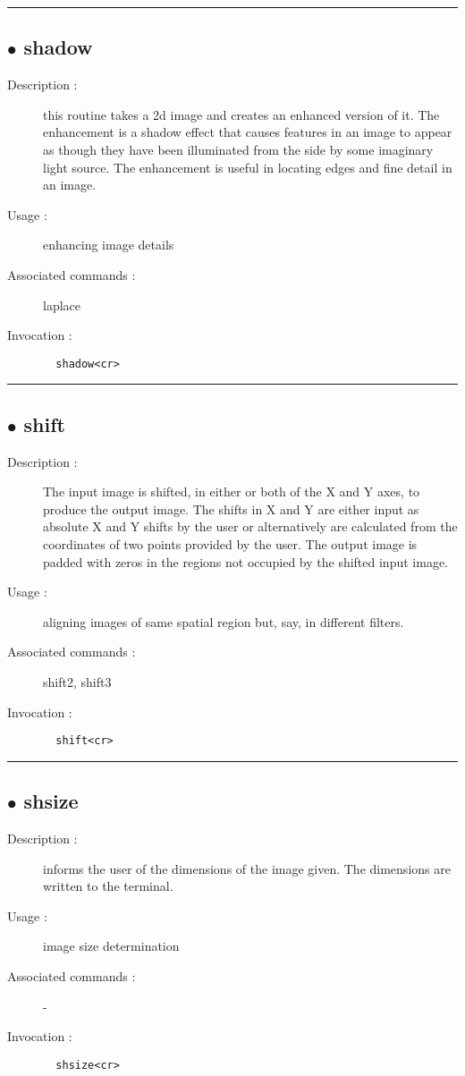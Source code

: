 \hrule \subsection*{$\bullet$ shadow}
\begin{description}
\item[Description :] this routine takes a 2d image and creates an enhanced version of
it. The enhancement is a shadow effect that causes features in an image
to appear as though they have been illuminated from the side by some
imaginary light source. The enhancement is useful in locating edges and
fine detail in an image.
\item[Usage :] enhancing image details
\item[Associated commands :] laplace
\item[Invocation :]

\verb+  shadow<cr> +\end{description}

\hrule \subsection*{$\bullet$ shift}
\begin{description}
\item[Description :] The input image is shifted, in either or both of the X and Y
axes, to produce the output image. The shifts in X and Y are either input
as absolute X and Y shifts by the user or alternatively are calculated
from the coordinates of two points provided by the user. The output image
is padded with zeros in the regions not occupied by the shifted input
image.
\item[Usage :] aligning images of same spatial region but, say, in different
filters.
\item[Associated commands :] shift2, shift3
\item[Invocation :]

\verb+  shift<cr> +\end{description}

\hrule \subsection*{$\bullet$ shsize}
\begin{description}
\item[Description :] informs the user of the dimensions of the image given.  The
dimensions are written to the terminal.
\item[Usage :] image size determination
\item[Associated commands :] -
\item[Invocation :]

\verb+  shsize<cr> +\end{description}

